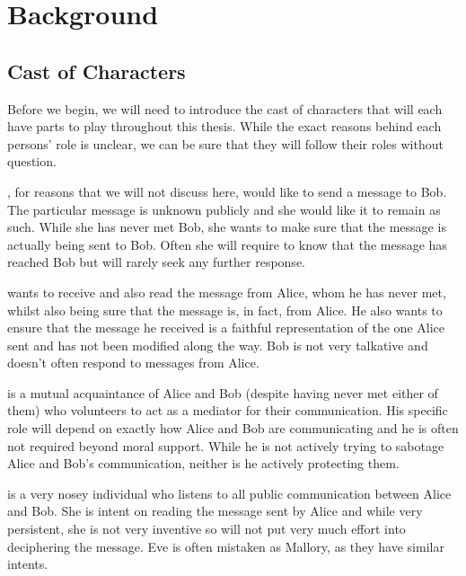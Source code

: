 %
%
\graphicspath{{./chapters/chapter02/fig02/}}

\let\textcircled=\pgftextcircled
\chapter{Background}
\label{chap:background}

\section{Cast of Characters}

Before we begin, we will need to introduce the cast of characters that will each have parts to play throughout this thesis. While the exact reasons behind each persons' role is unclear, we can be sure that they will follow their roles without question. 

, for reasons that we will not discuss here, would like to send a message to Bob. The particular message is unknown publicly and she would like it to remain as such. While she has never met Bob, she wants to make sure that the message is actually being sent to Bob. Often she will require to know that the message has reached Bob but will rarely seek any further response.

 wants to receive and also read the message from Alice, whom he has never met, whilst also being sure that the message is, in fact, from Alice. He also wants to ensure that the message he received is a faithful representation of the one Alice sent and has not been modified along the way. Bob is not very talkative and doesn't often respond to messages from Alice.

 is a mutual acquaintance of Alice and Bob (despite having never met either of them) who volunteers to act as a mediator for their communication. His specific role will depend on exactly how Alice and Bob are communicating and he is often not required beyond moral support. While he is not actively trying to sabotage Alice and Bob's communication, neither is he actively protecting them.

 is a very nosey individual who listens to all public communication between Alice and Bob. She is intent on reading the message sent by Alice and while very persistent, she is not very inventive so will not put very much effort into deciphering the message. Eve is often mistaken as Mallory, as they have similar intents.

